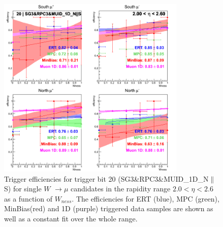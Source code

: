 \begin{figure}[h!]

  \centering

  \includegraphics[width=0.8\textwidth]{./figures/run13_trigeffisn_eta2_trig20_lin.png}
  \caption{\label{fig:run13_trigeffisn_eta2_nper0_trig20_lin} Trigger efficiencies for trigger bit 20 (SG3\&RPC3\&MUID\_1D\_N$\|$S) for single $W$ $\rightarrow \mu$ candidates in the rapidity range $ 2.0 < \eta < 2.6$ as a function of $W_{ness}$. The efficiencies for ERT (blue), MPC (green), MinBias(red) and 1D (purple) triggered data samples are shown as well as a constant fit over the whole range.}

\end{figure}
\clearpage
